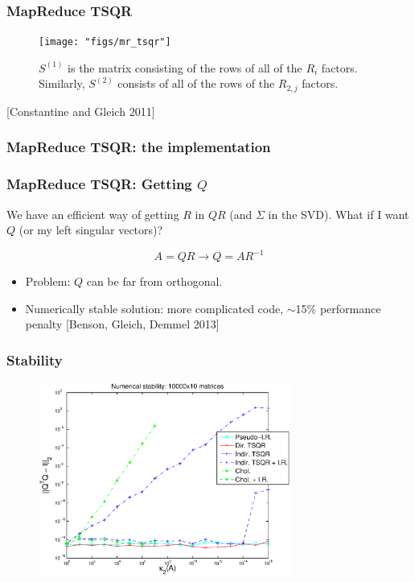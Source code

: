 \documentclass{beamer}
\begin{document}
\begin{frame}
\frametitle{MapReduce TSQR}

\begin{figure}[h!]
\centering
\texttt{[image: "figs/mr\_tsqr"]}
\caption{$S^{(1)}$ is the matrix consisting of the rows of all of the $R_i$ factors.  Similarly, $S^{(2)}$ consists of all of the rows of the $R_{2, j}$ factors.}
\end{figure}

[Constantine and Gleich 2011]

\end{frame}


\begin{frame}
\frametitle{MapReduce TSQR: the implementation}
\lstset{basicstyle=\tiny}
\lstset{numbers=left}

\end{frame}


\begin{frame}
\frametitle{MapReduce TSQR: Getting $Q$}
We have an efficient way of getting $R$ in $QR$ (and $\Sigma$ in the SVD).  What if I want $Q$ (or my left singular vectors)?

\vspace{0.2in}

\[
A = QR \rightarrow Q = AR^{-1}
\]

\vspace{0.2in}

\begin{itemize}
\item \textcolor{problem}{Problem}:  $Q$ can be far from orthogonal.
\item \textcolor{theblue}{Numerically stable solution}: more complicated code, $\sim$15\% performance penalty
[Benson, Gleich, Demmel 2013]
\end{itemize}

\end{frame}


\begin{frame}
\frametitle{Stability}

\begin{figure}[h!]
\centering
\includegraphics[height=2.5in]{"figs/stability"}
\end{figure}

\end{frame}
\end{document}
